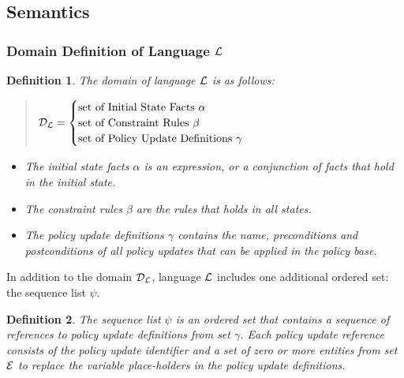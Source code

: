 \documentclass[10pt, twocolumn]{article}
\newtheorem{definition}{Definition}
\begin{document}
    \subsection{Semantics}

      \subsubsection{Domain Definition of Language ${\cal L}$}

        \begin{definition}
          The domain of language ${\cal L}$ is as follows:

          \begin{quote}
            \begin{math}
              {\cal D}_{\cal L} = 
              \begin{cases}
                \mbox{set of Initial State Facts $\alpha$} \\
                \mbox{set of Constraint Rules $\beta$} \\
                \mbox{set of Policy Update Definitions $\gamma$}
              \end{cases}
            \end{math}
          \end{quote}

          \begin{itemize}
            \item
              The initial state facts $\alpha$ is an expression, or a
              conjunction of facts that hold in the initial state.
            \item
              The constraint rules $\beta$ are the rules that holds in all
              states.
            \item
              The policy update definitions $\gamma$ contains the name,
              preconditions and postconditions of all policy updates that
              can be applied in the policy base.
          \end{itemize}
        \end{definition}

        In addition to the domain ${\cal D}_{\cal L}$, language ${\cal L}$
        includes one additional ordered set: the sequence list $\psi$.

        \begin{definition}
          The sequence list $\psi$ is an ordered set that contains a sequence 
          of references to policy update definitions from set $\gamma$. Each
          policy update reference consists of the policy update identifier and
          a set of zero or more entities from set ${\cal E}$ to replace the
          variable place-holders in the policy update definitions.
        \end{definition}
\end{document}
